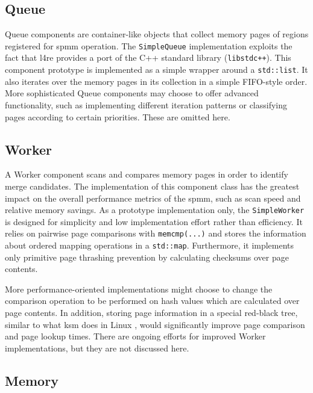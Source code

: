 \subsection*{Queue}
\label{subsec:queue}

Queue components are container-like objects that collect memory pages of regions registered for \ac{spmm} operation.
The \texttt{SimpleQueue} implementation exploits the fact that \ac{l4re} provides a port of the C++ standard library (\texttt{libstdc++}).
This component prototype is implemented as a simple wrapper around a \texttt{std::list}.
It also iterates over the memory pages in its collection in a simple FIFO-style order.
More sophisticated Queue components may choose to offer advanced functionality, such as implementing different iteration patterns or classifying pages according to certain priorities.
These are omitted here.

\subsection*{Worker}
\label{subsec:worker}

A Worker component scans and compares memory pages in order to identify merge candidates.
The implementation of this component class has the greatest impact on the overall performance metrics of the \ac{spmm}, such as scan speed and relative memory savings.
As a prototype implementation only, the \texttt{SimpleWorker} is designed for simplicity and low implementation effort rather than efficiency.
It relies on pairwise page comparisons with \texttt{memcmp(...)} and stores the information about ordered mapping operations in a \texttt{std::map}.
Furthermore, it implements only primitive page thrashing prevention by calculating checksums over page contents.

More performance-oriented implementations might choose to change the comparison operation to be performed on hash values which are calculated over page contents.
In addition, storing page information in a special red-black tree, similar to what \ac{ksm} does in Linux \cite{ksm2009}, would significantly improve page comparison and page lookup times.
There are ongoing efforts for improved Worker implementations, but they are not discussed here.

\subsection*{Memory}
\label{subsec:memory}

